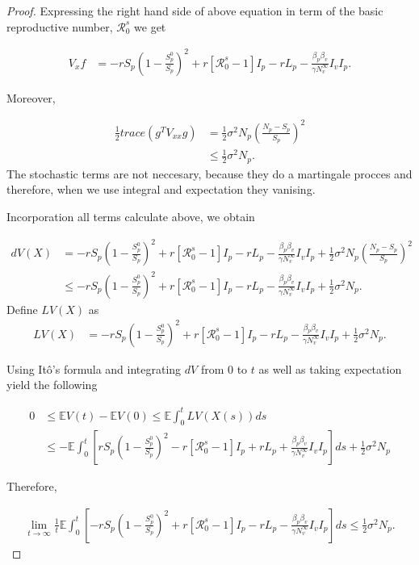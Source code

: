 \begin{proof}
	Expressing the right hand side of above equation in term of the basic reproductive number, $\mathcal{R}^s_0$ we get
	
	\begin{align*}
		V_x f &=
		-rS_p\left(1-\frac{S_p^0}{S_p}\right)^2 + r\left[\mathcal{R}^s_0-1\right]I_p-rL_p-\frac{\beta_p\beta_v}{\gamma N^\infty_v}I_vI_p.
	\end{align*}

	Moreover,
	
	\begin{align*}
		\frac{1}{2}trace(g^TV_{xx}g) 
			&=
				\frac{1}{2} \sigma^2N_p\left(\frac{N_p-S_p}{S_p}\right)^2\\
			&\leq
				\frac{1}{2} \sigma^2 N_p.
	\end{align*}
	The stochastic terms are not neccesary, because they do a martingale procces and therefore, when we use integral and expectation they vanising.
	
	Incorporation all terms calculate above, we obtain
	
		
	\begin{align*}
		dV(X) 
			&=
				-rS_p\left(1-\frac{S_p^0}{S_p}\right)^2 + r\left[\mathcal{R}^s_0-1\right]I_p-rL_p-\frac{\beta_p\beta_v}{\gamma N^\infty_v}I_vI_p+\frac{1}{2} \sigma^2N_p\left(\frac{N_p-S_p}{S_p}\right)^2\\
			&\leq
				-rS_p\left(1-\frac{S_p^0}{S_p}\right)^2 + r\left[\mathcal{R}^s_0-1\right]I_p-rL_p-\frac{\beta_p\beta_v}{\gamma N^\infty_v}I_vI_p+\frac{1}{2} \sigma^2 N_p.
	\end{align*}
	Define $LV(X)$ as
	\begin{align*}
		LV(X) 
			&=
				-rS_p\left(1-\frac{S_p^0}{S_p}\right)^2 + r\left[\mathcal{R}^s_0-1\right]I_p-rL_p-\frac{\beta_p\beta_v}{\gamma N^\infty_v}I_vI_p+\frac{1}{2} \sigma^2 N_p.
	\end{align*}
	
	Using It\^{o}'s formula and integrating $dV$ from $0$ to $t$ as well as taking expectation yield the following
	
	\begin{align*}
		0 
			&\leq
				\mathbb{E}V(t)-\mathbb{E}V(0)\leq\mathbb{E}\int_{0}^{t}LV(X(s))ds\\
			&\leq
				-\mathbb{E}\int_{0}^{t}\left[rS_p\left(1-\frac{S_p^0}{S_p}\right)^2 - r\left[\mathcal{R}^s_0-1\right]I_p+rL_p+\frac{\beta_p\beta_v}{\gamma N^\infty_v}I_vI_p\right]ds+ \frac{1}{2}\sigma^2 N_p
	\end{align*}
	
	Therefore,
	
	\begin{align*}
	\lim\limits_{t\rightarrow \infty}\frac{1}{t} 
	\mathbb{E}\int_{0}^{t}\left[-rS_p\left(1-\frac{S_p^0}{S_p}\right)^2 + r\left[\mathcal{R}^s_0-1\right]I_p-rL_p-\frac{\beta_p\beta_v}{\gamma N^\infty_v}I_vI_p\right]ds\leq \frac{1}{2}\sigma^2 N_p.
	\end{align*}
		
\end{proof}
